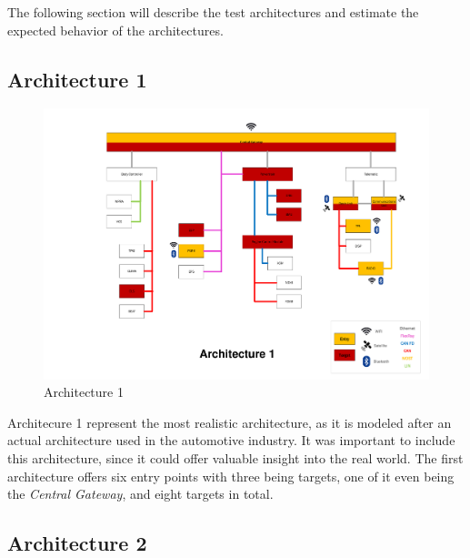 The following section will describe the test architectures and estimate the expected behavior of the architectures.

\subsection*{Architecture 1}
\label{sec:arch1}

\begin{figure}[h!]
    \caption{Architecture 1}
    \includegraphics[width=\textwidth, page=1]{../Architectures-survey.pdf}
\end{figure}

Architecure 1 represent the most realistic architecture, as it is modeled after an actual architecture used in the automotive industry.
It was important to include this architecture, since it could offer valuable insight into the real world.
The first architecture offers six entry points with three being targets, one of it even being the \textit{Central Gateway}, and eight targets in total.
\par


\subsection*{Architecture 2}
\label{sec:arch2}	

